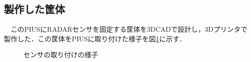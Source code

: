 \subsection{製作した筐体}
　このPIUSにRADARセンサを固定する筐体を3DCADで設計し，3Dプリンタで製作した．この筐体をPIUSに取り付けた様子を図\ref{fig:Housing}に示す．
\begin{figure}[H]
    \begin{center}
    \hspace{5truemm}
    \end{center}
	\caption{センサの取り付けの様子}
	\label{fig:Housing}
\end{figure}

